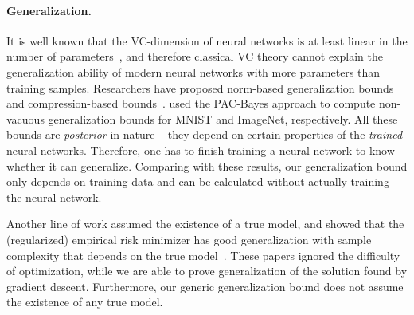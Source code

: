 \paragraph{Generalization.}
It is well known that the VC-dimension of neural networks is at least linear in the number of parameters~\citep{bartlett2017nearly}, and therefore classical VC theory cannot explain the generalization ability of modern neural networks with more parameters than training samples.
Researchers have proposed norm-based generalization bounds~\citep{bartlett2002rademacher,bartlett2017spectrally,neyshabur2015norm,neyshabur2017pac,neyshabur2018the,konstantinos2017pac,golowich2017size,li2018tighter} and compression-based bounds~\citep{arora2018stronger}.
\citet{dziugaite2017computing,zhou2018nonvacuous} used the PAC-Bayes approach to compute non-vacuous generalization bounds for MNIST and ImageNet, respectively.
All these bounds are \emph{posterior} in nature -- they depend on certain properties of the \emph{trained} neural networks.
Therefore, %
one has to finish training a neural network to know whether it can generalize.
Comparing with these results, our generalization bound only depends on training data and can be calculated without actually training the neural network.


Another line of work assumed the existence of a true model, and showed that the (regularized) empirical risk minimizer has good generalization with sample complexity that depends on the true model~\citep{du2018many,ma2018priori,imaizumi2018deep}.
These papers ignored the difficulty of optimization, while we are able to prove generalization of the solution found by gradient descent.
Furthermore, our generic generalization bound does not assume the existence of any true model.

